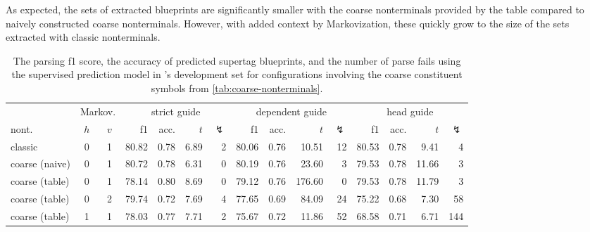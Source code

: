 \documentclass[../../document.tex]{subfiles}
\begin{document}
    As expected, the sets of extracted blueprints are significantly smaller with the coarse nonterminals provided by the table compared to naively constructed coarse nonterminals.
    However, with added context by Markovization, these quickly grow to the size of the sets extracted with classic nonterminals.
    
    \begin{table}
        \caption{\label{tbl:gridsearch:coarse:2}
        The parsing f1 score, the accuracy of predicted supertag blueprints, and the number of parse fails using the supervised prediction model in \negra{}'s development set for configurations involving the coarse constituent symbols from \cref{tab:coarse-nonterminals}.
        }
        \centering
        \vspace{.2cm}
        \setlength{\tabcolsep}{3.4pt}
        \begin{tabular}{lcc|rrrr|rrrr|rrrr}
            \toprule
& \multicolumn{2}{c|}{Markov.}         & \multicolumn{4}{c|}{strict guide} &  \multicolumn{4}{c|}{dependent guide} &  \multicolumn{4}{c}{head guide} \\
nont.           & \(h\) & \(v\) & f1 & acc. & $t$ & $\lightning$ & f1 & acc. & $t$ & $\lightning$  & f1 & acc. & $t$ & $\lightning$  \\ \hline\rowcolor{black!10}
classic        & 0 & 1 & 80.82 & 0.78 & 6.89 & 2 & 80.06 & 0.76 &  10.51 & 12 & 80.53 & 0.78 &  9.41 & 4 \\\rowcolor{black!10}
coarse (naive) & 0 & 1 & 80.72 & 0.78 & 6.31 & 0 & 80.19 & 0.76 &  23.60 &  3 & 79.53 & 0.78 & 11.66 & 3 \\\hline
coarse (table) & 0 & 1 & 78.14 & 0.80 & 8.69 & 0 & 79.12 & 0.76 & 176.60 &  0 & 79.53 & 0.78 & 11.79 & 3 \\
coarse (table) & 0 & 2 & 79.74 & 0.72 & 7.69 & 4 & 77.65 & 0.69 &  84.09 & 24 & 75.22 & 0.68 &  7.30 & 58 \\
coarse (table) & 1 & 1 & 78.03 & 0.77 & 7.71 & 2 & 75.67 & 0.72 &  11.86 & 52 & 68.58 & 0.71 &  6.71 & 144 \\
\bottomrule
        \end{tabular}
    \end{table}
\end{document}
